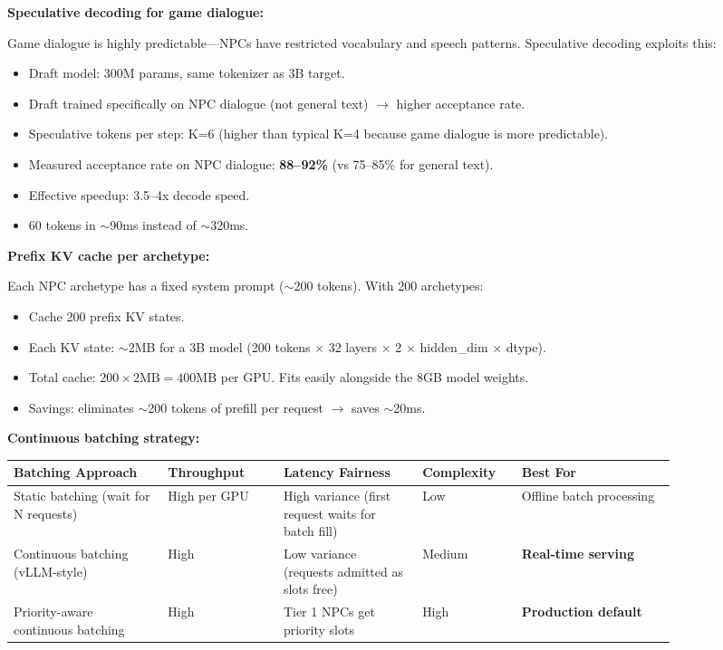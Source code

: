 \textbf{Speculative decoding for game dialogue:}

Game dialogue is highly predictable---NPCs have restricted vocabulary and speech patterns. Speculative decoding exploits this:
\begin{itemize}
  \item Draft model: 300M params, same tokenizer as 3B target.
  \item Draft trained specifically on NPC dialogue (not general text) $\rightarrow$ higher acceptance rate.
  \item Speculative tokens per step: K=6 (higher than typical K=4 because game dialogue is more predictable).
  \item Measured acceptance rate on NPC dialogue: \textbf{88--92\%} (vs 75--85\% for general text).
  \item Effective speedup: 3.5--4x decode speed.
  \item 60 tokens in $\sim$90ms instead of $\sim$320ms.
\end{itemize}

\textbf{Prefix KV cache per archetype:}

Each NPC archetype has a fixed system prompt ($\sim$200 tokens). With 200 archetypes:
\begin{itemize}
  \item Cache 200 prefix KV states.
  \item Each KV state: $\sim$2MB for a 3B model (200 tokens $\times$ 32 layers $\times$ 2 $\times$ hidden\_dim $\times$ dtype).
  \item Total cache: $200 \times 2\text{MB} = 400\text{MB}$ per GPU. Fits easily alongside the 8GB model weights.
  \item Savings: eliminates $\sim$200 tokens of prefill per request $\rightarrow$ saves $\sim$20ms.
\end{itemize}

\textbf{Continuous batching strategy:}

\begin{tabular}{|p{0.2\linewidth}|p{0.15\linewidth}|p{0.18\linewidth}|p{0.12\linewidth}|p{0.2\linewidth}|}
\hline
\textbf{Batching Approach} & \textbf{Throughput} & \textbf{Latency Fairness} & \textbf{Complexity} & \textbf{Best For} \\
\hline
Static batching (wait for N requests) & High per GPU & High variance (first request waits for batch fill) & Low & Offline batch processing \\
\hline
Continuous batching (vLLM-style) & High & Low variance (requests admitted as slots free) & Medium & \textbf{Real-time serving} \\
\hline
Priority-aware continuous batching & High & Tier 1 NPCs get priority slots & High & \textbf{Production default} \\
\hline
\end{tabular}

